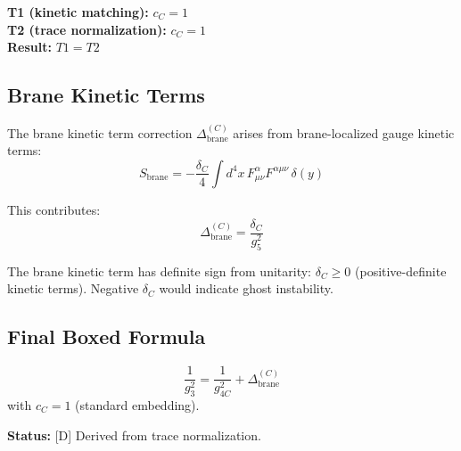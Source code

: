 \documentclass[11pt,a4paper]{article}
\theoremstyle{definition}
\begin{document}
\begin{invariancebox}
\textbf{T1 (kinetic matching):} $c_C = 1$ \\
\textbf{T2 (trace normalization):} $c_C = 1$ \\
\textbf{Result:} $\boxed{T1 = T2}$ \checkmark
\end{invariancebox}

\subsection{Brane Kinetic Terms}
\label{subsec:brane-kinetic}

The brane kinetic term correction $\Delta_{\text{brane}}^{(C)}$ arises from
brane-localized gauge kinetic terms:
\begin{equation}
  \label{eq:brane-kinetic-def}
  S_{\text{brane}} = -\frac{\delta_C}{4} \int d^4x \, F_{\mu\nu}^{\alpha} F^{\alpha\mu\nu} \, \delta(y)
\end{equation}

This contributes:
\begin{equation}
  \label{eq:delta-brane-c}
  \Delta_{\text{brane}}^{(C)} = \frac{\delta_C}{g_5^2}
\end{equation}

\begin{trapbox}
The brane kinetic term has definite sign from unitarity:
$\delta_C \geq 0$ (positive-definite kinetic terms).
Negative $\delta_C$ would indicate ghost instability.
\end{trapbox}

\subsection{Final Boxed Formula}
\label{subsec:final-color-formula}

\begin{predictionbox}
\begin{equation}
  \label{eq:color-matching-final}
  \boxed{\frac{1}{g_3^2} = \frac{1}{g_{4C}^2} + \Delta_{\text{brane}}^{(C)}}
\end{equation}
with $c_C = 1$ (standard embedding).

\textbf{Status:} [D] Derived from trace normalization.
\end{predictionbox}

\newpage

\end{document}
